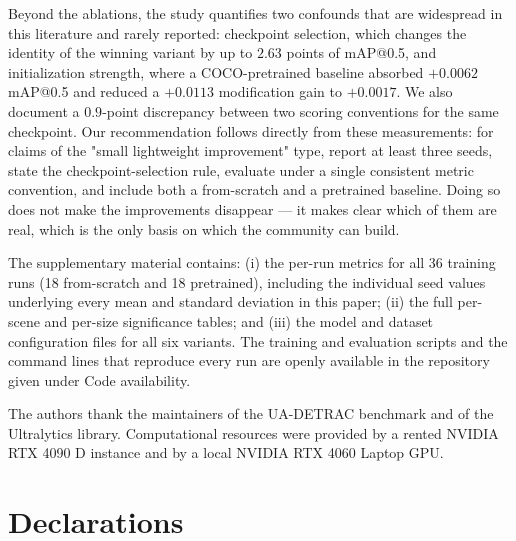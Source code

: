 \documentclass[pdflatex,sn-basic,Numbered]{sn-jnl}%
\begin{document}
Beyond the ablations, the study quantifies two confounds that are widespread in this literature and rarely reported: checkpoint selection, which changes the identity of the winning variant by up to $2.63$ points of mAP@0.5, and initialization strength, where a COCO-pretrained baseline absorbed $+0.0062$ mAP@0.5 and reduced a $+0.0113$ modification gain to $+0.0017$. We also document a $0.9$-point discrepancy between two scoring conventions for the same checkpoint. Our recommendation follows directly from these measurements: for claims of the "small lightweight improvement" type, report at least three seeds, state the checkpoint-selection rule, evaluate under a single consistent metric convention, and include both a from-scratch and a pretrained baseline. Doing so does not make the improvements disappear --- it makes clear which of them are real, which is the only basis on which the community can build.

\backmatter


The supplementary material contains: (i) the per-run metrics for all 36 training runs (18 from-scratch and 18 pretrained), including the individual seed values underlying every mean and standard deviation in this paper; (ii) the full per-scene and per-size significance tables; and (iii) the model and dataset configuration files for all six variants. The training and evaluation scripts and the command lines that reproduce every run are openly available in the repository given under Code availability.


The authors thank the maintainers of the UA-DETRAC benchmark and of the Ultralytics library. Computational resources were provided by a rented NVIDIA RTX 4090 D instance and by a local NVIDIA RTX 4060 Laptop GPU.

\section*{Declarations}
\end{document}
